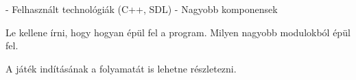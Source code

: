 \label{Chap:komponensek}

- Felhasznált technológiák (C++, SDL)
- Nagyobb komponensek

Le kellene írni, hogy hogyan épül fel a program. Milyen nagyobb modulokból épül fel.

A játék indításának a folyamatát is lehetne részletezni.
